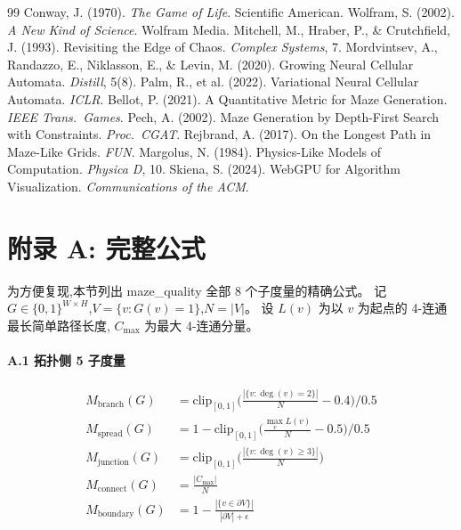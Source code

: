\documentclass[11pt,a4paper]{article}
\begin{document}
\begin{thebibliography}{99}
\small
{} Conway, J. (1970). \textit{The Game of Life}. Scientific American.
 Wolfram, S. (2002). \textit{A New Kind of Science}. Wolfram Media.
 Mitchell, M., Hraber, P., \& Crutchfield, J. (1993). Revisiting the Edge of Chaos. \textit{Complex Systems}, 7.
 Mordvintsev, A., Randazzo, E., Niklasson, E., \& Levin, M. (2020). Growing Neural Cellular Automata. \textit{Distill}, 5(8).
 Palm, R., et al. (2022). Variational Neural Cellular Automata. \textit{ICLR}.
 Bellot, P. (2021). A Quantitative Metric for Maze Generation. \textit{IEEE Trans.\ Games}.
 Pech, A. (2002). Maze Generation by Depth-First Search with Constraints. \textit{Proc.\ CGAT}.
 Rejbrand, A. (2017). On the Longest Path in Maze-Like Grids. \textit{FUN}.
 Margolus, N. (1984). Physics-Like Models of Computation. \textit{Physica D}, 10.
 Skiena, S. (2024). WebGPU for Algorithm Visualization. \textit{Communications of the ACM}.
\end{thebibliography}

\appendix
\section{附录 A: 完整公式}
为方便复现,本节列出 maze\_quality 全部 8 个子度量的精确公式。
记 $G \in \{0,1\}^{W \times H}$,$V = \{v : G(v) = 1\}$,$N = |V|$。
设 $L(v)$ 为以 $v$ 为起点的 4-连通最长简单路径长度,
$C_{\max}$ 为最大 4-连通分量。

\paragraph{A.1 拓扑侧 5 子度量}
\begin{align}
M_{\text{branch}}(G) &= \text{clip}_{[0,1]}\!\Big(\frac{|\{v : \deg(v)=2\}|}{N} - 0.4\Big) / 0.5 \\
M_{\text{spread}}(G) &= 1 - \text{clip}_{[0,1]}\!\Big(\frac{\max_v L(v)}{N} - 0.5\Big) / 0.5 \\
M_{\text{junction}}(G) &= \text{clip}_{[0,1]}\!\Big(\frac{|\{v : \deg(v) \ge 3\}|}{N}\Big) \\
M_{\text{connect}}(G) &= \frac{|C_{\max}|}{N} \\
M_{\text{boundary}}(G) &= 1 - \frac{|\{v \in \partial V\}|}{|\partial V| + \epsilon}
\end{align}
\end{document}
